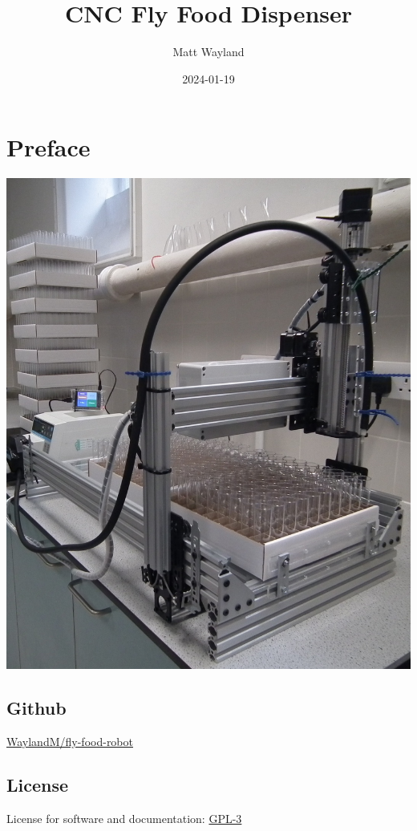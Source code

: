 \documentclass[
]{book}
\title{CNC Fly Food Dispenser}
\author{Matt Wayland}
\date{2024-01-19}
\begin{document}
\maketitle

{
\setcounter{tocdepth}{1}
\tableofcontents
}
\hypertarget{preface}{%
\chapter*{Preface}\label{preface}}

\begin{center}\includegraphics[width=0.75\linewidth]{images/system} \end{center}

\hypertarget{github}{%
\section*{Github}\label{github}}

\href{https://github.com/WaylandM/fly-food-robot}{WaylandM/fly-food-robot}

\hypertarget{license}{%
\section*{License}\label{license}}

License for software and documentation:
\href{https://www.gnu.org/licenses/gpl-3.0.en.html}{GPL-3}
\end{document}
